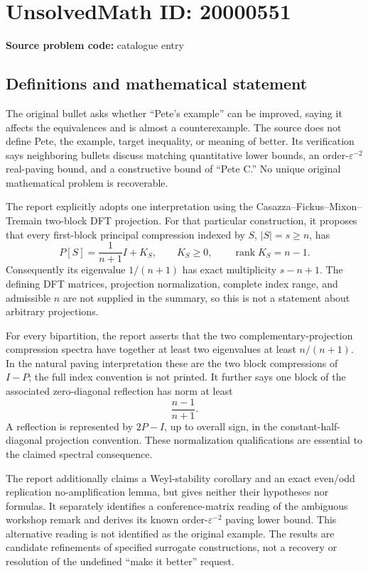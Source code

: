\documentclass[11pt]{article}
\begin{document}
\section*{UnsolvedMath ID: 20000551}
\textbf{Source problem code:} catalogue entry
\subsection{Definitions and mathematical statement}
The original bullet asks whether ``Pete's example'' can be improved, saying it affects the equivalences and is almost a counterexample. The source does not define Pete, the example, target inequality, or meaning of better. Its verification says neighboring bullets discuss matching quantitative lower bounds, an order-\(\varepsilon^{-2}\) real-paving bound, and a constructive bound of ``Pete C.'' No unique original mathematical problem is recoverable.

The report explicitly adopts one interpretation using the Casazza--Fickus--Mixon--Tremain two-block DFT projection. For that particular construction, it proposes that every first-block principal compression indexed by \(S\), \(|S|=s\geq n\), has
\[
P[S]=\frac1{n+1}I+K_S,\qquad K_S\geq0,\qquad\operatorname{rank}K_S=n-1.
\]
Consequently its eigenvalue \(1/(n+1)\) has exact multiplicity \(s-n+1\). The defining DFT matrices, projection normalization, complete index range, and admissible \(n\) are not supplied in the summary, so this is not a statement about arbitrary projections.

For every bipartition, the report asserts that the two complementary-projection compression spectra have together at least two eigenvalues at least \(n/(n+1)\). In the natural paving interpretation these are the two block compressions of \(I-P\); the full index convention is not printed. It further says one block of the associated zero-diagonal reflection has norm at least
\[
\frac{n-1}{n+1}.
\]
A reflection is represented by \(2P-I\), up to overall sign, in the constant-half-diagonal projection convention. These normalization qualifications are essential to the claimed spectral consequence.

The report additionally claims a Weyl-stability corollary and an exact even/odd replication no-amplification lemma, but gives neither their hypotheses nor formulas. It separately identifies a conference-matrix reading of the ambiguous workshop remark and derives its known order-\(\varepsilon^{-2}\) paving lower bound. This alternative reading is not identified as the original example. The results are candidate refinements of specified surrogate constructions, not a recovery or resolution of the undefined ``make it better'' request.
\end{document}
